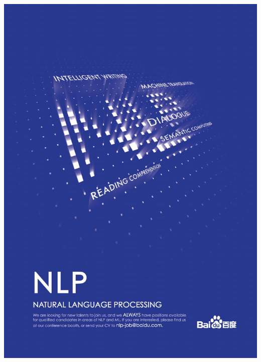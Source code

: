 \thispagestyle{empty}
\begin{center}
  \vfill
  \includegraphics[width=\textwidth]{content/ads/full/baidu.pdf}
  \vfill
\end{center}

